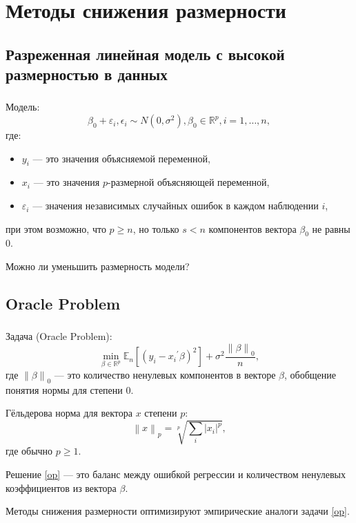 \documentclass[c, dvipsnames]{beamer}  %
\begin{document}
\section{Методы снижения размерности}
\subsection{Разреженная линейная модель с высокой размерностью в данных}

\begin{frame}[shrink=5]
\frametitle{\insertsection} 
\framesubtitle{\insertsubsection}
Модель: 
  \begin{equation} 
\beta_0 + \varepsilon_i, \epsilon_i \sim N(0, \sigma^2), \beta_0 \in
\mathbb{R}^p, i = 1, \dots, n, 
\end{equation}
где:
  \begin{itemize}
\item $y_i$ --- это значения объясняемой
переменной, 
\item $x_i$ --- это значения $p$-размерной объясняющей переменной,
\item $\varepsilon_i$ --- значения независимых случайных ошибок в каждом наблюдении $i$, 
\end{itemize}
при этом возможно, что $p \geq n$, но только $s<n$ компонентов вектора $\beta_0$ не равны $0$.

\item \alert{Можно ли уменьшить размерность модели?}
\end{frame}

\subsection{Oracle Problem}
\begin{frame}[shrink=5]
\frametitle{\insertsection} 
\framesubtitle{\insertsubsection}
\begin{block}{Задача (Oracle Problem):}
\begin{equation}\label{op}
    \min_{\beta \in
\mathbb{R}^p} \mathbb{E}_n\left[ (y_i - {x_i}^{'} \beta)^2 \right] + \sigma^2
\frac{\left\lVert \beta \right\rVert_0}{n}, 
\end{equation} 
где $\left\lVert \beta \right\rVert_0$ --- это количество ненулевых компонентов в векторе $\beta$,  обобщение понятия нормы для степени $0$. 
\end{block}
\begin{block}{Гёльдерова норма для вектора $x$ степени $p$: }
\begin{equation}
    \left\lVert x \right\rVert_p = \sqrt[p]{\sum_i|x_i|^p},
\end{equation}
где обычно $p \geq 1$.

\end{block}

Решение \eqref{op} --- это  баланс между ошибкой регрессии и количеством ненулевых коэффициентов из вектора $\beta$. 

Методы снижения размерности оптимизируют эмпирические аналоги задачи \eqref{op}.
\end{frame}
\end{document}
